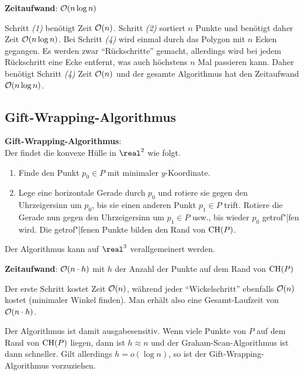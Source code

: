 \linie

\textbf{Zeitaufwand}:
$\mathcal{O}(n \log n)$

\begin{Beweis}
    Schritt \emph{(1)} benötigt Zeit $\mathcal{O}(n)$.
    Schritt \emph{(2)} sortiert $n$ Punkte und benötigt daher Zeit $\mathcal{O}(n \log n)$.
    Bei Schritt \emph{(4)} wird einmal durch das Polygon mit $n$ Ecken gegangen.
    Es werden zwar "`Rückschritte"' gemacht, allerdings wird bei jedem Rückschritt eine Ecke
    entfernt, was auch höchstens $n$ Mal passieren kann.
    Daher benötigt Schritt \emph{(4)} Zeit $\mathcal{O}(n)$ und der gesamte Algorithmus hat den
    Zeitaufwand $\mathcal{O}(n \log n)$.
\end{Beweis}

\pagebreak

\subsection{%
    Gift-Wrapping-Algorithmus%
}

\textbf{Gift-Wrapping-Algorithmus}:\\
Der  findet die konvexe Hülle in $\real^2$ wie folgt.
\begin{enumerate}
    \item
    Finde den Punkt $p_0 \in P$ mit minimaler $y$-Koordinate.
    
    \item
    Lege eine horizontale Gerade durch $p_0$ und rotiere sie gegen den Uhrzeigersinn um $p_0$,
    bis sie einen anderen Punkt $p_1 \in P$ trift.
    Rotiere die Gerade nun gegen den Uhrzeigersinn um $p_1 \in P$ usw.,
    bis wieder $p_0$ getrof"|fen wird.
    Die getrof"|fenen Punkte bilden den Rand von $\operatorname{CH}(P)$.
\end{enumerate}
Der Algorithmus kann auf $\real^3$ verallgemeinert werden.

\linie

\textbf{Zeitaufwand}:
$\mathcal{O}(n \cdot h)$ mit $h$ der Anzahl der Punkte auf dem Rand von $\operatorname{CH}(P)$

\begin{Beweis}
    Der erste Schritt kostet Zeit $\mathcal{O}(n)$,
    während jeder "`Wickelschritt"' ebenfalls $\mathcal{O}(n)$ kostet (minimaler Winkel finden).
    Man erhält also eine Gesamt-Laufzeit von $\mathcal{O}(n \cdot h)$.
\end{Beweis}

Der Algorithmus ist damit ausgabesensitiv.
Wenn viele Punkte von $P$ auf dem Rand von $\operatorname{CH}(P)$ liegen, dann ist $h \approx n$ und
der Graham-Scan-Algorithmus ist dann schneller.
Gilt allerdings $h = o(\log n)$, so ist der Gift-Wrapping-Algorithmus vorzuziehen.

